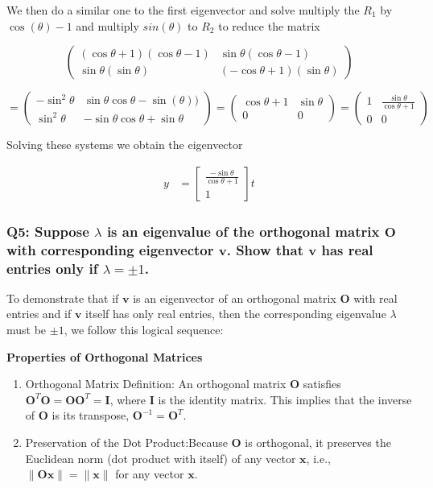 \documentclass[8pt]{article}
\begin{document}
{{We then do a similar one to the first eigenvector and solve multiply the $R_1$ by $\cos(\theta) -1$ and multiply $sin(\theta)$ to $R_2$ to reduce the matrix

$$
\begin{pmatrix}
(\cos \theta + 1)(\cos \theta -1) & \sin \theta (\cos \theta - 1)\\
\sin \theta (\sin \theta) & (-\cos \theta +1)(\sin \theta)
\end{pmatrix} 
$$

$$
= \begin{pmatrix}
-\sin^2 \theta & \sin \theta \cos \theta - \sin(\theta))\\
\sin^2 \theta & -\sin \theta\cos \theta +\sin \theta
\end{pmatrix} =
\begin{pmatrix}
\cos \theta +1 & \sin \theta \\
0 & 0
\end{pmatrix} =
\begin{pmatrix}
1 & \frac{\sin \theta}{\cos \theta +1} \\
0 & 0
\end{pmatrix}
$$


Solving these systems we obtain the eigenvector 

\begin{align}
    y &= \begin{bmatrix}
           \frac{-\sin \theta }{\cos \theta +1} \\
           1
         \end{bmatrix}t 
\end{align}

\subsubsection*{Q5: Suppose \(\lambda\) is an eigenvalue of the orthogonal matrix \(\mathbf{O}\) with corresponding eigenvector \(\mathbf{v}\). Show that \(\mathbf{v}\) has real entries only if \(\lambda = \pm 1\).}

To demonstrate that if \(\mathbf{v}\) is an eigenvector of an orthogonal matrix \(\mathbf{O}\) with real entries and if \(\mathbf{v}\) itself has only real entries, then the corresponding eigenvalue \(\lambda\) must be \(\pm 1\), we follow this logical sequence:

\textbf{Properties of Orthogonal Matrices}

\begin{enumerate}
    \item Orthogonal Matrix Definition: An orthogonal matrix \(\mathbf{O}\) satisfies \(\mathbf{O}^T \mathbf{O} = \mathbf{O} \mathbf{O}^T = \mathbf{I}\), where \(\mathbf{I}\) is the identity matrix. This implies that the inverse of \(\mathbf{O}\) is its transpose, \(\mathbf{O}^{-1} = \mathbf{O}^T\).
    \item Preservation of the Dot Product:Because \(\mathbf{O}\) is orthogonal, it preserves the Euclidean norm (dot product with itself) of any vector \(\mathbf{x}\), i.e., \(\|\mathbf{Ox}\| = \|\mathbf{x}\|\) for any vector \(\mathbf{x}\).
\end{enumerate}

}}
\end{document}
